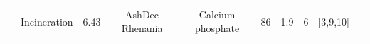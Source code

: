 \documentclass[authoryear]{elsarticle}
\begin{document}
\begin{table}
{\begin{threeparttable}
\begin{tabular}{@{}cccccccccc@{}}
			                                                                                                                                                         & Incineration                                                                     & 6.43                                      & AshDec Rhenania                                                                          & Calcium phosphate                                                                 & 86                                                                                    & 1.9                                  & 6                                                            &    [3,9,10]      \\

\end{tabular}
\end{threeparttable}}
\end{table}
\end{document}
